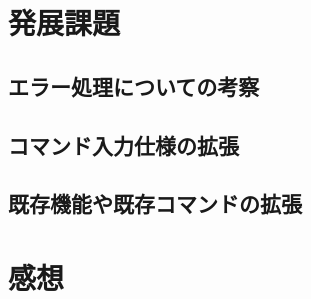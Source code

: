 \section{発展課題} \label{advancedfunction}

\subsection{エラー処理についての考察}

\subsection{コマンド入力仕様の拡張}

\subsection{既存機能や既存コマンドの拡張}

\section{感想}\label{sec:review}

